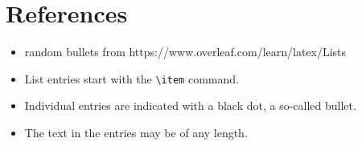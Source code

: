 \section{References}
\begin{itemize}
  \item random bullets from https://www.overleaf.com/learn/latex/Lists
  \item List entries start with the \verb|\item| command.
  \item Individual entries are indicated with a black dot, a so-called bullet.
  \item The text in the entries may be of any length.
\end{itemize}